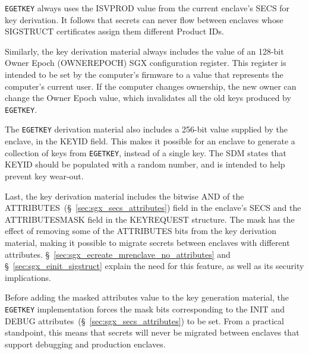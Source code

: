 \texttt{EGETKEY} always uses the ISVPROD value from the current enclave's SECS
for key derivation. It follows that secrets can never flow between enclaves
whose SIGSTRUCT certificates assign them different Product IDs.

Similarly, the key derivation material always includes the value of an 128-bit
Owner Epoch (OWNEREPOCH) SGX configuration register. This register is intended
to be set by the computer's firmware to a value that represents the computer's
current user. If the computer changes ownership, the new owner can change the
Owner Epoch value, which invalidates all the old keys produced by
\texttt{EGETKEY}.

The \texttt{EGETKEY} derivation material also includes a 256-bit value supplied
by the enclave, in the KEYID field. This makes it possible for an enclave to
generate a collection of keys from \texttt{EGETKEY}, instead of a single key.
The SDM states that KEYID should be populated with a random number, and is
intended to help prevent key wear-out.

Last, the key derivation material includes the bitwise AND of the
ATTRIBUTES~(\S~\ref{sec:sgx_secs_attributes}) field in the enclave's SECS and
the ATTRIBUTESMASK field in the KEYREQUEST structure. The mask has the effect
of removing some of the ATTRIBUTES bits from the key derivation material,
making it possible to migrate secrets between enclaves with different
attributes. \S~\ref{sec:sgx_ecreate_mrenclave_no_attributes} and
\S~\ref{sec:sgx_einit_sigstruct} explain the need for this feature, as well as
its security implications.

Before adding the masked attributes value to the key generation material, the
\texttt{EGETKEY} implementation forces the mask bits corresponding to the
INIT and DEBUG attributes~(\S~\ref{sec:sgx_secs_attributes}) to be set. From a
practical standpoint, this means that secrets will never be migrated between
enclaves that support debugging and production enclaves.
